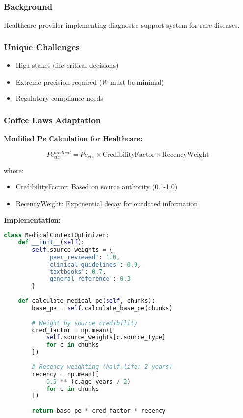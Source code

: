 \documentclass[conference]{IEEEtran}
\begin{document}
\subsubsection{Background}

Healthcare provider implementing diagnostic support system for rare diseases.

\subsubsection{Unique Challenges}

\begin{itemize}
\item High stakes (life-critical decisions)
\item Extreme precision required ($W$ must be minimal)
\item Regulatory compliance needs
\end{itemize}

\subsubsection{Coffee Laws Adaptation}

\textbf{Modified Pe Calculation for Healthcare:}

\begin{equation}
Pe_{ctx}^{medical} = Pe_{ctx} \times \text{CredibilityFactor} \times \text{RecencyWeight}
\end{equation}

where:
\begin{itemize}
\item CredibilityFactor: Based on source authority (0.1-1.0)
\item RecencyWeight: Exponential decay for outdated information
\end{itemize}

\textbf{Implementation:}

\begin{lstlisting}[language=Python, basicstyle=\small]
class MedicalContextOptimizer:
    def __init__(self):
        self.source_weights = {
            'peer_reviewed': 1.0,
            'clinical_guidelines': 0.9,
            'textbooks': 0.7,
            'general_reference': 0.3
        }
    
    def calculate_medical_pe(self, chunks):
        base_pe = self.calculate_base_pe(chunks)
        
        # Weight by source credibility
        cred_factor = np.mean([
            self.source_weights[c.source_type]
            for c in chunks
        ])
        
        # Recency weighting (half-life: 2 years)
        recency = np.mean([
            0.5 ** (c.age_years / 2)
            for c in chunks
        ])
        
        return base_pe * cred_factor * recency
\end{lstlisting}
\end{document}
